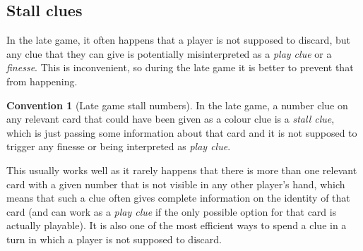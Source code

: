 \documentclass[a4paper]{article}
\theoremstyle{plain}
\theoremstyle{definition}
\newtheorem{convention}[theorem]{Convention}
\begin{document}
\subsection{Stall clues}

In the late game, it often happens that a player is not supposed to discard, but any clue that they can give is potentially misinterpreted as a \emph{play clue} or a \emph{finesse}. This is inconvenient, so during the late game it is better to prevent that from happening.

\begin{convention}[Late game stall numbers]
	In the late game, a number clue on any relevant card that could have been given as a colour clue is a \emph{stall clue}, which is just passing some information about that card and it is not supposed to trigger any finesse or being interpreted as \emph{play clue}.
\end{convention}

This usually works well as it rarely happens that there is more than one relevant card with a given number that is not visible in any other player's hand, which means that such a clue often gives complete information on the identity of that card (and can work as a \emph{play clue} if the only possible option for that card is actually playable). It is also one of the most efficient ways to spend a clue in a turn in which a player is not supposed to discard.
\end{document}
